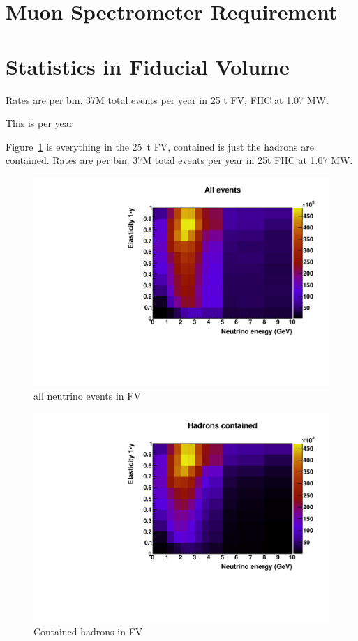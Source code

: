 \documentclass[a4paper]{article}
\begin{document}
\section{Muon Spectrometer Requirement}

\section{Statistics in Fiducial Volume}\label{sec:rates}

Rates are per bin. 37M total events per year in 25 t FV, FHC at 1.07 MW.

This is per year

Figure~\ref{fig:all_ey} is everything in the 25~t FV, contained is just the hadrons are contained.  Rates are per bin.  37M total events per year in 25t FHC at 1.07 MW.

\begin{figure}[tbp]
	\centering
	\includegraphics[width=\textwidth]{Figures/all_ey}
	\caption{all neutrino events in FV}
	\label{fig:all_ey}
\end{figure}

\begin{figure}[tbp]
	\centering
	\includegraphics[width=\textwidth]{Figures/hadContNorm_ey}
	\caption{Contained hadrons in FV}
	\label{fig:hadContNorm_ey}
\end{figure}
\end{document}
